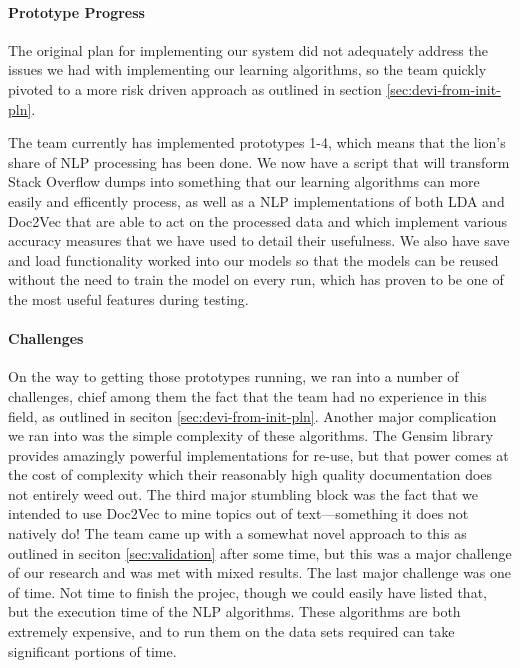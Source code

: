 
\paragraph{Prototype Progress}
The original plan for implementing our system did not adequately
address the issues we had with implementing our learning algorithms,
so the team quickly pivoted to a more risk driven approach as outlined
in section \ref{sec:devi-from-init-pln}.

The team currently has implemented prototypes 1-4, which means that
the lion's share of NLP processing has been done.
We now have a script that will transform Stack Overflow dumps into
something that our learning algorithms can more easily and efficently
process, as well as a NLP implementations of both LDA and Doc2Vec that
are able to act on the processed data and which implement various
accuracy measures that we have used to detail their usefulness.
We also have save and load functionality worked into our models so
that the models can be reused without the need to train the model on
every run, which has proven to be one of the most useful features
during testing.  


\paragraph{Challenges}
On the way to getting those prototypes running, we ran into a number
of challenges, chief among them the fact that the team had no
experience in this field, as outlined in seciton \ref{sec:devi-from-init-pln}.
Another major complication we ran into was the simple complexity of
these algorithms.  The Gensim library provides amazingly powerful
implementations for re-use, but that power comes at the cost of
complexity which their reasonably high quality documentation does not
entirely weed out.
The third major stumbling block was the fact that we intended to use
Doc2Vec to mine topics out of text---something it does not natively
do!  
The team came up with a somewhat novel approach to this as outlined in
seciton \ref{sec:validation} after some time,
but this was a major challenge of our research and was met with mixed results.  
The last major challenge was one of time.
Not time to finish the projec, though we could easily have listed
that, but the execution time of the NLP algorithms.
These algorithms are both extremely expensive, and to run them on the
data sets required can take significant portions of time.


